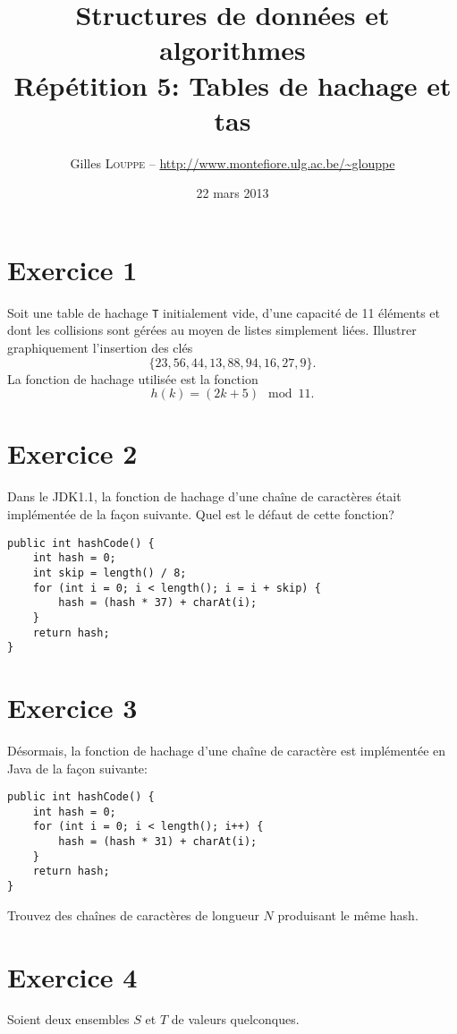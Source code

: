 \documentclass[a4paper,10pt]{article}
\title{
    \textbf{Structures de données et algorithmes}\\
    Répétition 5: Tables de hachage et tas
}
\author{Gilles \textsc{Louppe} -- \url{http://www.montefiore.ulg.ac.be/~glouppe}}
\date{22 mars 2013}
\begin{document}
\maketitle

\section*{Exercice 1}

Soit une table de hachage \texttt{T} initialement vide, d'une capacité de 11 éléments et dont les collisions sont gérées au moyen de listes simplement liées. Illustrer graphiquement l'insertion des clés $$\{23, 56, 44, 13, 88, 94, 16, 27, 9\}.$$ La fonction de hachage utilisée est la fonction $$h(k) = (2k + 5) \mod 11.$$

\section*{Exercice 2}

Dans le JDK1.1, la fonction de hachage d'une chaîne de caractères était implémentée de la façon suivante. Quel est le défaut de cette fonction?

\begin{verbatim}
public int hashCode() {
    int hash = 0;
    int skip = length() / 8;
    for (int i = 0; i < length(); i = i + skip) {
        hash = (hash * 37) + charAt(i);
    }
    return hash;
}
\end{verbatim}

\section*{Exercice 3}

Désormais, la fonction de hachage d'une chaîne de caractère est implémentée en Java de la façon suivante:

\begin{verbatim}
public int hashCode() {
    int hash = 0;
    for (int i = 0; i < length(); i++) {
        hash = (hash * 31) + charAt(i);
    }
    return hash;
}
\end{verbatim}

Trouvez des chaînes de caractères de longueur $N$ produisant le même hash.

\section*{Exercice 4}

Soient deux ensembles $S$ et $T$ de valeurs quelconques.
\end{document}
